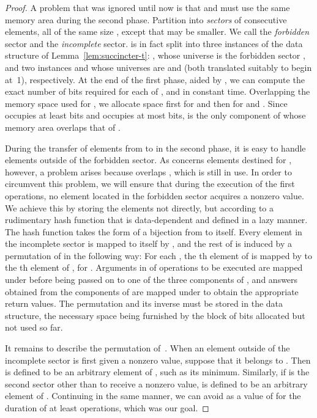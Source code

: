\documentclass[envcountsame,envcountsect,undated,nolinenumbers]{lnthi}
\begin{document}
\begin{proof}
A problem that was ignored until now is
that  and  must use the same memory area
during the second phase.
Partition  into  \emph{sectors}
 of consecutive elements,
all of the same size ,
except that  may be smaller.
We call  the \emph{forbidden} sector
and  the \emph{incomplete} sector.
 is in fact split into three instances of
the data structure of Lemma~\ref{lem:succincter-t}:
, whose universe is the forbidden sector ,
and two instances  and 
whose universes are
 and 
(both translated suitably to begin at~1),
respectively.
At the end of the first phase, aided by ,
we can compute the exact number of bits required
for each of ,  and  in constant time.
Overlapping the memory space used for ,
we allocate space first for  and then for
 and .
Since  occupies at least  bits
and  occupies at most  bits,
 is the only component of  whose memory
area overlaps that of .

During the transfer of elements from  to 
in the second phase,
it is easy to handle
elements outside of the forbidden sector.
As concerns elements destined for , however,
a problem arises because
 overlaps , which is still in use.
In order to circumvent this problem, we will
ensure that during the execution of the
first  operations, no element
located in the forbidden sector
acquires a nonzero value.
We achieve this by storing the elements not directly, but
according to a rudimentary hash function that
is data-dependent and defined in a lazy manner.
The hash function takes the form of a bijection
 from  to itself.
Every element in the incomplete sector is mapped to
itself by , and the rest of  is induced
by a permutation  of 
in the following way:
For each , the th element
of  is mapped by  to the th element
of , for .
Arguments in  of operations to be executed
are mapped under  before being passed on
to one of the three components of , and
answers obtained from the components of  are
mapped under  to obtain the
appropriate return values.
The permutation  and its inverse must
be stored in the data structure, the necessary
space being furnished by the block of
 bits allocated but not used so far.

It remains to describe the permutation  of~.
When an element outside of the incomplete sector is
first given a nonzero value,
suppose that it belongs to .
Then  is defined to be an arbitrary
element of , such as its minimum.
Similarly, if  is the second sector
other than  to receive
a nonzero value,  is defined to
be an arbitrary element of
.
Continuing in the same manner, we can avoid
 as a value of  for the duration
of at least  operations, which
was our goal.


\end{proof}
\end{document}
